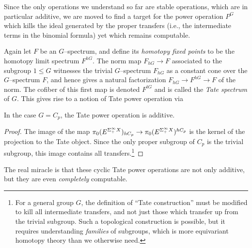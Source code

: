 Since the only operations we understand so far are stable operations, which are in particular additive, we are moved to find a target for the power operation $P^G$ which kills the ideal generated by the proper transfers (i.e., the intermediate terms in the binomial formula) yet which remains computable.

\begin{definition}
Again let $F$ be an $G$--spectrum, and define its \textit{homotopy fixed points} to be the homotopy limit spectrum $F^{hG}$.  The norm map $F_{hG} \to F$ associated to the subgroup $1 \le G$ witnesses the trivial $G$--spectrum $F_{hG}$ as a constant cone over the $G$--spectrum $F$, and hence gives a natural factorization $F_{hG} \to F^{hG} \to F$ of the norm.  The cofiber of this first map is denoted $F^{tG}$ and is called the \textit{Tate spectrum} of $G$.  This gives rise to a notion of Tate power operation via
\begin{center}
\end{center}
\end{definition}

\begin{lemma}
In the case $G = C_p$, the Tate power operation is additive.
\end{lemma}
\begin{proof}
The image of the map $\pi_0 (E^{\Sigma^\infty_+ X})_{hC_p} \to \pi_0 (E^{\Sigma^\infty_+ X})^{hC_p}$ is the kernel of the projection to the Tate object.  Since the only proper subgroup of $C_p$ is the trivial subgroup, this image contains all transfers.\footnote{For a general group $G$, the definition of ``Tate construction'' must be modified to kill all intermediate transfers, and not just those which transfer up from the trivial subgroup.  Such a topological construction is possible, but it requires understanding \textit{families} of subgroups, which is more equivariant homotopy theory than we otherwise need.}
\end{proof}

The real miracle is that these cyclic Tate power operations are not only additive, but they are even \emph{completely} computable.


